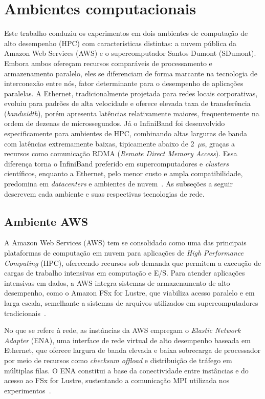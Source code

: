 \section{Ambientes computacionais}
\label{sec:ambientes_computacionais}
Este trabalho conduziu os experimentos em dois ambientes de
computação de alto desempenho (HPC) com características distintas: a nuvem
pública da Amazon Web Services (AWS) e o supercomputador Santos Dumont
(SDumont). Embora ambos ofereçam recursos comparáveis de processamento e
armazenamento paralelo, eles se diferenciam de forma marcante na tecnologia
de interconexão entre nós, fator determinante para o desempenho de
aplicações paralelas. A Ethernet, tradicionalmente projetada para redes
locais corporativas, evoluiu para padrões de alta velocidade e oferece
elevada taxa de transferência (\textit{bandwidth}), porém apresenta
latências relativamente maiores, frequentemente na ordem de dezenas de
microssegundos. Já o InfiniBand foi desenvolvido especificamente para
ambientes de HPC, combinando altas larguras de banda com latências
extremamente baixas, tipicamente abaixo de 2~$\mu$s, graças a recursos como
comunicação RDMA (\textit{Remote Direct Memory Access}). Essa diferença
torna o InfiniBand preferido em supercomputadores e \textit{clusters}
científicos, enquanto a Ethernet, pelo menor custo e ampla
compatibilidade, predomina em \textit{datacenters} e ambientes de
nuvem~\cite{Fds:03,RlGmmts:05}. As subseções a seguir descrevem cada
ambiente e suas respectivas tecnologias de rede.

\subsection{Ambiente AWS}
\label{sec:ambiente_aws}
A Amazon Web Services (AWS) tem se consolidado como uma das principais
plataformas de computação em nuvem para aplicações de \textit{High
Performance Computing} (HPC), oferecendo recursos sob demanda que permitem
a execução de cargas de trabalho intensivas em computação e E/S. Para
atender aplicações intensivas em dados, a AWS integra sistemas de
armazenamento de alto desempenho, como o Amazon FSx for Lustre, que
viabiliza acesso paralelo e em larga escala, semelhante a sistemas de
arquivos utilizados em supercomputadores
tradicionais~\cite{Krlkssj:10,Hmns:20}.

No que se refere à rede, as instâncias da AWS empregam o
\textit{Elastic Network Adapter} (ENA), uma interface de rede virtual de
alto desempenho baseada em Ethernet, que oferece largura de banda elevada
e baixa sobrecarga de processador por meio de recursos como
\textit{checksum offload} e distribuição de tráfego em múltiplas filas. O
ENA constitui a base da conectividade entre instâncias e do acesso ao FSx
for Lustre, sustentando a comunicação MPI utilizada nos
experimentos~\cite{aws:ena}.

